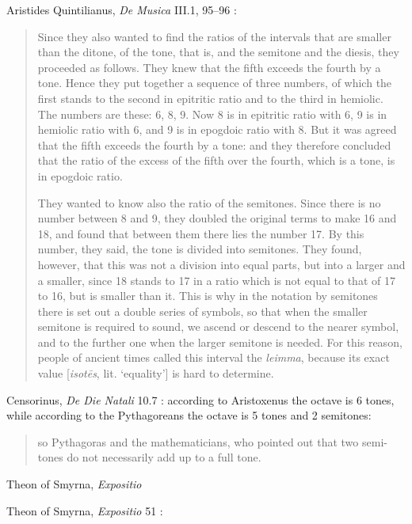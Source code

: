 \documentclass{amsart}
\theoremstyle{definition}
\begin{document}
Aristides Quintilianus, {\em De Musica} III.1, 95--96 \cite[pp.~495--496]{barker}: 

\begin{quote}
Since they also wanted to find the ratios of the intervals that are smaller than
the ditone, of the tone, that is, and the semitone and the diesis, they proceeded
as follows. They knew that the fifth exceeds the fourth by a tone. Hence they
put together a sequence of three numbers, of which the first stands to the
second in epitritic ratio and to the third in hemiolic. The numbers are these:
6, 8, 9. Now 8 is in epitritic ratio with 6, 9 is in hemiolic ratio with 6, and 9
is in epogdoic ratio with 8. But it was agreed that the fifth exceeds the fourth
by a tone: and they therefore concluded that the ratio of the excess of the fifth
over the fourth, which is a tone, is in epogdoic ratio.

They wanted to know also the ratio of the semitones. Since there is no
number between 8 and 9, they doubled the original terms to make 16 and 18,
and found that between them there lies the number 17. By this number, they
said, the tone is divided into semitones. They found, however, that this was not
a division into equal parts, but into a larger and a smaller, since 18 stands to
17 in a ratio which is not equal to that of 17 to 16, but is smaller than it. This
is why in the notation by semitones there is set out a double series of symbols,
so that when the smaller semitone is required to sound, we ascend or descend
to the nearer symbol, and to the further one when the larger semitone is needed.
For this reason, people of ancient times called this interval the {\em leimma}, because
its exact value [{\em isot\={e}s}, lit. `equality'] is hard to determine.
\end{quote}

Censorinus, {\em De Die Natali} 10.7 \cite[p.~18]{censorinus}: according to Aristoxenus the octave is 6 tones, while
according to the Pythagoreans the octave is 5 tones and 2 semitones:

\begin{quote}
so Pythagoras and the mathematicians, who pointed
out that two semi-tones do not necessarily add up to a full tone.
\end{quote}

Theon of Smyrna, {\em Expositio} \cite{dupuis}

Theon of Smyrna, {\em Expositio} 51 \cite[pp.~214--215]{barker}:
\end{document}
